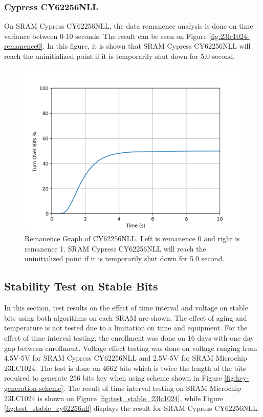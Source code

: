 \subsubsection{Cypress CY62256NLL}

On SRAM Cypress CY62256NLL, the data remanence analysis is done on time variance between 0-10 seconds. The result can be seen on Figure \ref{fig:23lc1024-remanence0}. In this figure, it is shown that
SRAM Cypress CY62256NLL will reach the uninitialized point if it is temporarily shut down for 5.0 second.

\begin{figure}[tph!]
    \centerline{\includegraphics[width={\textwidth}]{images/remanence_cy62256nll_0}}
    \caption{Remanence Graph of CY62256NLL. Left is remanence 0 and right is remanence 1. SRAM Cypress CY62256NLL will reach the uninitialized point if it is temporarily shut down for 5.0 second.}
    \label{fig:CY62256NLL-remanence0}
\end{figure}


\subsection{Stability Test on Stable Bits}
In this section, test results on the effect of time interval and voltage on stable bits using both algorithms on each SRAM are shown. The effect of aging and temperature is not tested due to a limitation on time and equipment. For the effect of time interval testing, the enrollment was done on 16 days with one day gap between enrollment. Voltage effect testing was done on voltage ranging from 4.5V-5V for SRAM Cypress CY62256NLL and 2.5V-5V for SRAM Microchip 23LC1024. The test is done on 4662 bits which is twice the length of the bits required to generate 256 bits key when using scheme shown in Figure \ref{fig:key-generation-scheme}. The result of time interval testing on SRAM Microchip 23LC1024 is shown on Figure \ref{fig:test_stable_23lc1024}, while Figure \ref{fig:test_stable_cy62256nll} displays the result for SRAM Cypress CY62256NLL.

